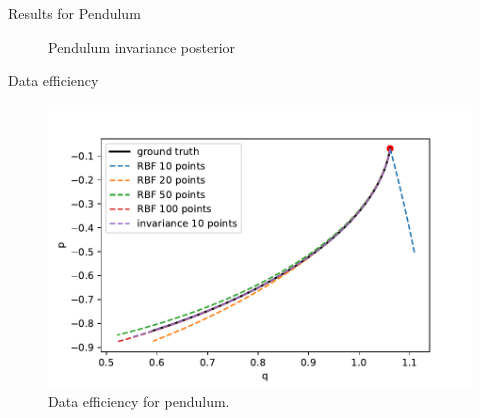 \documentclass{beamer}
\begin{document}
\begin{frame}{Results for Pendulum}
{\begin{figure}[H]
	\centering
         \caption{Pendulum invariance posterior}
\end{figure}
}


	
\end{frame}

\begin{frame}{Data efficiency}
\begin{figure}[H] 
  \includegraphics[width=0.8\linewidth]{../codes/figures/data_efficiency.pdf}
  \centering
  \caption{Data efficiency for pendulum.} \end{figure}
\end{frame}
\end{document}
